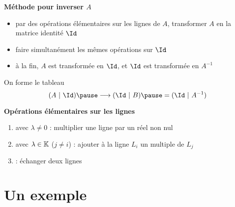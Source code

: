  
\begin{frame}
\textbf{Méthode pour inverser $A$}
\begin{itemize}
\item\pause par des opérations élémentaires sur les lignes de $A$, transformer $A$ en la matrice identité $\Id$
\item\pause faire simultanément les mêmes opérations sur $\Id$
\item\pause à la fin, $A$ est transformée en $\Id$, et $\Id$ est transformée en $A^{-1}$
\end{itemize}

\pause
On forme le tableau
\vspace{-.1cm}
\[
(A\ |\ \Id) \pause \longrightarrow (\Id\ |\ B) \pause =  (\Id\ |\ A^{-1}) 
\]

\pause
\textbf{Opérations élémentaires sur les lignes}

\begin{enumerate}
  \item\pause {} avec $\lambda \neq 0$ : 
  multiplier une ligne par un réel non nul 
      
  \item\pause {} avec $\lambda \in \mathbb{K}$ ($j\neq i$) :
  ajouter à la ligne $L_i$ un multiple de $L_j$
  
  \item\pause {} : échanger deux lignes
\end{enumerate}
\end{frame}


\section{Un exemple}
 
